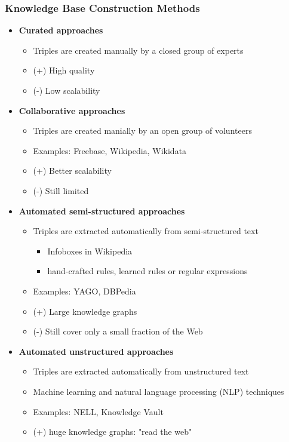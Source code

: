 			\subsubsection{Knowledge Base Construction Methods}
				\begin{itemize}
					\item \textbf{Curated approaches}
						\begin{itemize}
							\item Triples are created manually by a closed group of experts
							\item (+) High quality
							\item (-) Low scalability
						\end{itemize}
					\item \textbf{Collaborative approaches}
						\begin{itemize}
							\item Triples are created manially by an open group of volunteers
							\item Examples: Freebase, Wikipedia, Wikidata
							\item (+) Better scalability
							\item (-) Still limited
						\end{itemize}
					\item \textbf{Automated semi-structured approaches}
						\begin{itemize}
							\item Triples are extracted automatically from semi-structured text
								\begin{itemize}
									\item Infoboxes in Wikipedia
									\item hand-crafted rules, learned rules or regular expressions
								\end{itemize}
							\item Examples: YAGO, DBPedia
							\item (+) Large knowledge graphs
							\item (-) Still cover only a small fraction of the Web
						\end{itemize}
					\item \textbf{Automated unstructured approaches}
						\begin{itemize}
							\item Triples are extracted automatically from unstructured text
							\item Machine learning and natural language processing (NLP) techniques
							\item Examples: NELL, Knowledge Vault
							\item (+) huge knowledge graphs: "read the web"
						\end{itemize}
				\end{itemize}

